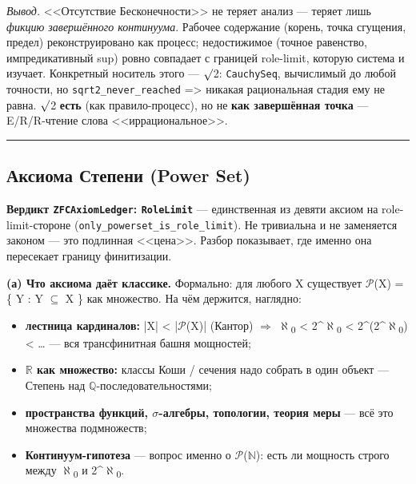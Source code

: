 \documentclass[11pt,a4paper]{article}
\begin{document}
\emph{Вывод.} <<Отсутствие Бесконечности>> не теряет анализ --- теряет лишь \emph{фикцию завершённого континуума}. Рабочее содержание (корень, точка сгущения, предел) реконструировано как процесс; недостижимое (точное равенство, импредикативный sup) ровно совпадает с границей role-limit, которую система и изучает. Конкретный носитель этого --- $\surd$2: \texttt{Cauchy\allowbreak{}Seq}, вычислимый до любой точности, но \texttt{sqrt2\_\allowbreak{}never\_\allowbreak{}reached} => никакая рациональная стадия ему не равна. $\surd$2 \textbf{есть} (как правило-процесс), но не \textbf{как завершённая точка} --- E/R/R-чтение слова <<иррациональное>>.

\bigskip\hrule\bigskip

\subsection{Аксиома Степени (Power Set)}

\textbf{Вердикт \texttt{ZFCAxiom\allowbreak{}Ledger}: \texttt{Role\allowbreak{}Limit}} --- единственная из девяти аксиом на role-limit-стороне (\texttt{only\_\allowbreak{}powerset\_\allowbreak{}is\_\allowbreak{}role\_\allowbreak{}limit}). Не тривиальна и не заменяется законом --- это подлинная <<цена>>. Разбор показывает, где именно она пересекает границу финитизации.

\textbf{(а) Что аксиома даёт классике.} Формально: для любого X существует $\mathcal{P}$(X) = \{ Y : Y $\subseteq$ X \} как множество. На чём держится, наглядно:
\begin{itemize}
\item \textbf{лестница кардиналов:} |X| < |$\mathcal{P}$(X)| (Кантор) $\Longrightarrow$ $\aleph$\textsubscript{0} < 2\textasciicircum{}$\aleph$\textsubscript{0} < 2\textasciicircum{}(2\textasciicircum{}$\aleph$\textsubscript{0}) < \ldots{} --- вся трансфинитная башня мощностей;
\item \textbf{$\mathbb{R}$ как множество:} классы Коши / сечения надо собрать в один объект --- Степень над $\mathbb{Q}$-последовательностями;
\item \textbf{пространства функций, $\sigma$-алгебры, топологии, теория меры} --- всё это множества подмножеств;
\item \textbf{Континуум-гипотеза} --- вопрос именно о $\mathcal{P}$($\mathbb{N}$): есть ли мощность строго между $\aleph$\textsubscript{0} и 2\textasciicircum{}$\aleph$\textsubscript{0}.
\end{itemize}
\end{document}
